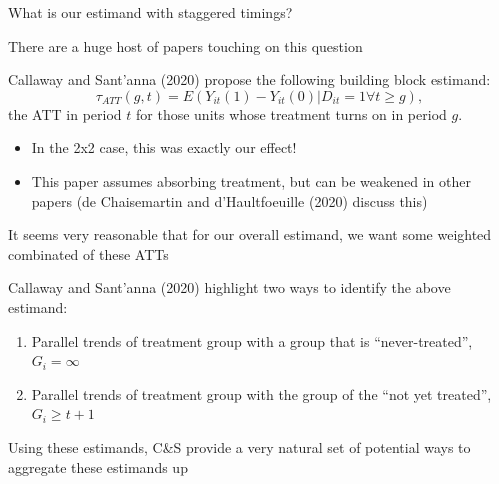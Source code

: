 \documentclass[notes,11pt, aspectratio=169]{beamer}
\newenvironment{wideitemize}{\itemize\addtolength{\itemsep}{10pt}}{\enditemize}
\begin{document}
\begin{frame}{What is our estimand with staggered timings?} 
  \begin{wideitemize}
  \item There are a huge host of papers touching on this question
  \item Callaway and Sant'anna (2020) propose the following building block estimand:
    \begin{equation}
      \tau_{ATT}(g,t) = E(Y_{it}(1) - Y_{it}(0) | D_{it} = 1 \forall t \geq g), 
    \end{equation}
    the ATT in period $t$ for those units whose treatment turns on in period $g$.
    \begin{itemize}
    \item In the 2x2 case, this was exactly our effect!
    \item This paper assumes absorbing treatment, but can be weakened in
      other papers (de Chaisemartin and d'Haultfoeuille (2020) discuss
      this)
    \end{itemize}
  \item It seems very reasonable that for our overall estimand, we
    want some weighted combinated of these ATTs
  \item Callaway and Sant'anna (2020) highlight two ways to identify the above estimand:
    \begin{enumerate}
    \item Parallel trends of treatment group with a group that is ``never-treated'',  $G_{i} = \infty$
    \item Parallel trends of treatment group with the group of the ``not yet treated'',   $G_{i} \geq t + 1$
    \end{enumerate}
  \item Using these estimands, C\&S provide a very natural set of
    potential ways to aggregate these estimands up
  \end{wideitemize}

\end{frame}
\end{document}

